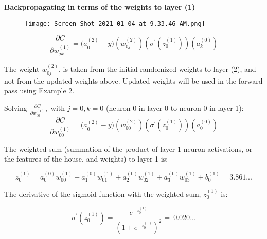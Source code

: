 \documentclass[12pt,a4paper]{article}
\begin{document}
\textbf{Backpropagating in terms of the weights to layer (1)}
\begin{multicols}{2}

\begin{figure}[H]
    \centering
    \texttt{[image: Screen Shot 2021-01-04 at 9.33.46 AM.png]}
    \caption{}
    \label{fig:my_label}
\end{figure}


\columnbreak

\begin{equation}
\frac{\partial C}{\partial w_{jk}^{\left(1\right)}}={(a}_0^{\left(2\right)}-y)(w_{0j}^{\left(2\right)})\left(\sigma^\prime\left(z_0^{\left(1\right)}\right)\right)(a_k^{\left(0\right)})
\end{equation}

The weight $w_{0j}^{\left(2\right)}$, is taken from the initial randomized weights to layer (2), and not from the updated weights above. Updated weights will be used in the forward pass using Example 2.

Solving $\frac{\partial C}{\partial w_{00}^{\left(1\right)}},$ with $j=0, k=0$ (neuron 0 in layer 0 to neuron 0 in layer 1):
\begin{equation}
\frac{\partial C}{\partial w_{00}^{\left(1\right)}}={(a}_0^{\left(2\right)}-y)\left(w_{00}^{\left(2\right)}\right)\left(\sigma^\prime\left(z_0^{\left(1\right)}\right)\right)(a_0^{\left(0\right)})
\end{equation}

\end{multicols}


The weighted sum (summation of the product of layer 1 neuron activations, or the features of the house, and weights) to layer 1 is:

\begin{equation}
z_0^{\left(1\right)}=a_0^{\left(0\right)}w_{00}^{\left(1\right)}+a_1^{\left(0\right)}w_{01}^{\left(1\right)}+a_2^{\left(0\right)}w_{02}^{\left(1\right)}+a_3^{\left(0\right)}w_{03}^{\left(1\right)}+b_0^{\left(1\right)}=3.861... 
\end{equation}

The derivative of the sigmoid function with the weighted sum, $z_0^{\left(1\right)}$ is:



\begin{equation}
\sigma^\prime\left(z_0^{\left(1\right)}\right)=\frac{e^{-z_0^{\left(1\right)}}}{\left(1+e^{-z_0^{\left(1\right)}}\right)^2}=\ 0.020...
\end{equation}
\end{document}
